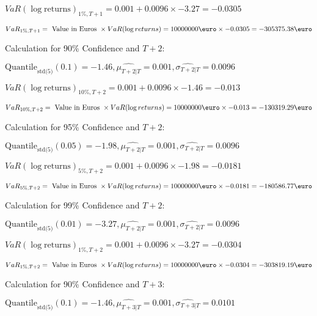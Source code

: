 \indent\indent $VaR(\log \text{returns})_{1\%, T + 1} = 0.001 + 0.0096\times-3.27 = -0.0305$

\indent\indent $VaR_{1\%, T + 1} = \text{ Value in Euros } \times VaR(\log returns) = 10 000 000 \text{\euro} \times-0.0305 = -305375.38 \text{\euro}$\newline




Calculation for 90\% Confidence and $T+2$:

\indent\indent $\text{Quantile}_\text{std(5)}(0.1) = -1.46,\hat{\mu_{T+2|T}} = 0.001, \hat{\sigma_{T+2|T}} = 0.0096$

\indent\indent $VaR(\log \text{returns})_{10\%, T + 2} = 0.001 + 0.0096\times-1.46 = -0.013$

\indent\indent $VaR_{10\%, T + 2} = \text{ Value in Euros } \times VaR(\log returns) = 10 000 000 \text{\euro} \times-0.013 = -130319.29 \text{\euro}$\newline




Calculation for 95\% Confidence and $T+2$:

\indent\indent $\text{Quantile}_\text{std(5)}(0.05) = -1.98,\hat{\mu_{T+2|T}} = 0.001, \hat{\sigma_{T+2|T}} = 0.0096$

\indent\indent $VaR(\log \text{returns})_{5\%, T + 2} = 0.001 + 0.0096\times-1.98 = -0.0181$

\indent\indent $VaR_{5\%, T + 2} = \text{ Value in Euros } \times VaR(\log returns) = 10 000 000 \text{\euro} \times-0.0181 = -180586.77 \text{\euro}$\newline




Calculation for 99\% Confidence and $T+2$:

\indent\indent $\text{Quantile}_\text{std(5)}(0.01) = -3.27,\hat{\mu_{T+2|T}} = 0.001, \hat{\sigma_{T+2|T}} = 0.0096$

\indent\indent $VaR(\log \text{returns})_{1\%, T + 2} = 0.001 + 0.0096\times-3.27 = -0.0304$

\indent\indent $VaR_{1\%, T + 2} = \text{ Value in Euros } \times VaR(\log returns) = 10 000 000 \text{\euro} \times-0.0304 = -303819.19 \text{\euro}$\newline




Calculation for 90\% Confidence and $T+3$:

\indent\indent $\text{Quantile}_\text{std(5)}(0.1) = -1.46,\hat{\mu_{T+3|T}} = 0.001, \hat{\sigma_{T+3|T}} = 0.0101$

